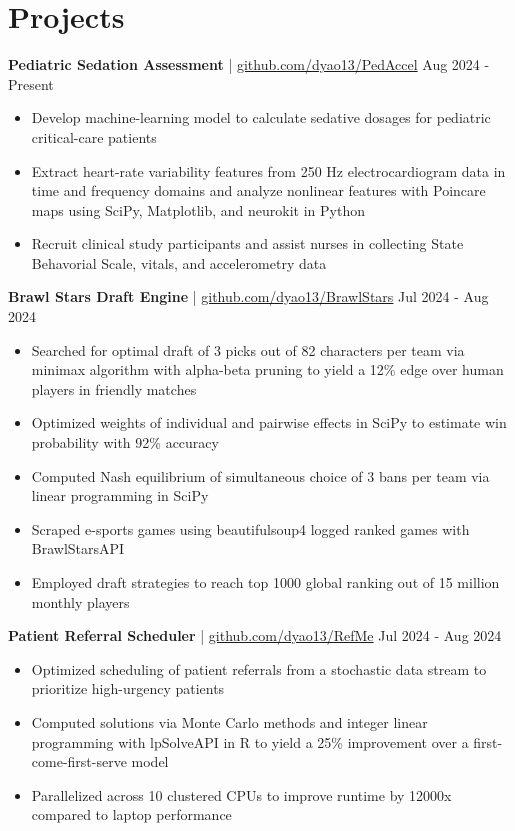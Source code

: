 \documentclass[11pt]{article}       %
\begin{document}
\vspace{-18.5pt}

\section*{Projects}
\textbf{Pediatric Sedation Assessment} | \href{https://github.com/dyao13/PedAccel}{github.com/dyao13/PedAccel} \hfill Aug 2024 - Present \vspace{-9pt} \\
\begin{itemize}
  \item Develop machine-learning model to calculate sedative dosages for pediatric critical-care patients
  \item Extract heart-rate variability features from 250 Hz electrocardiogram data in time and frequency domains and analyze nonlinear features with Poincare maps using SciPy, Matplotlib, and neurokit in Python
  \item Recruit clinical study participants and assist nurses in collecting State Behavorial Scale, vitals, and accelerometry data
\end{itemize}

\textbf{Brawl Stars Draft Engine} | \href{https://github.com/dyao13/BrawlStars}{github.com/dyao13/BrawlStars} \hfill Jul 2024 - Aug 2024 \vspace{-9pt} \\
\begin{itemize}
  \item Searched for optimal draft of 3 picks out of 82 characters per team via minimax algorithm with alpha-beta pruning to yield a 12\% edge over human players in friendly matches
  \item Optimized weights of individual and pairwise effects in SciPy to estimate win probability with 92\% accuracy
  \item Computed Nash equilibrium of simultaneous choice of 3 bans per team via linear programming in SciPy
  \item Scraped e-sports games using beautifulsoup4 logged ranked games with BrawlStarsAPI
  \item Employed draft strategies to reach top 1000 global ranking out of 15 million monthly players
\end{itemize}

\textbf{Patient Referral Scheduler} | \href{https://github.com/dyao13/RefMe}{github.com/dyao13/RefMe} \hfill Jul 2024 - Aug 2024 \vspace{-9pt} \\
\begin{itemize}
  \item Optimized scheduling of patient referrals from a stochastic data stream to prioritize high-urgency patients 
  \item Computed solutions via Monte Carlo methods and integer linear programming with lpSolveAPI in R to yield a 25\% improvement over a first-come-first-serve model
  \item Parallelized across 10 clustered CPUs to improve runtime by 12000x compared to laptop performance
\end{itemize}
\end{document}
